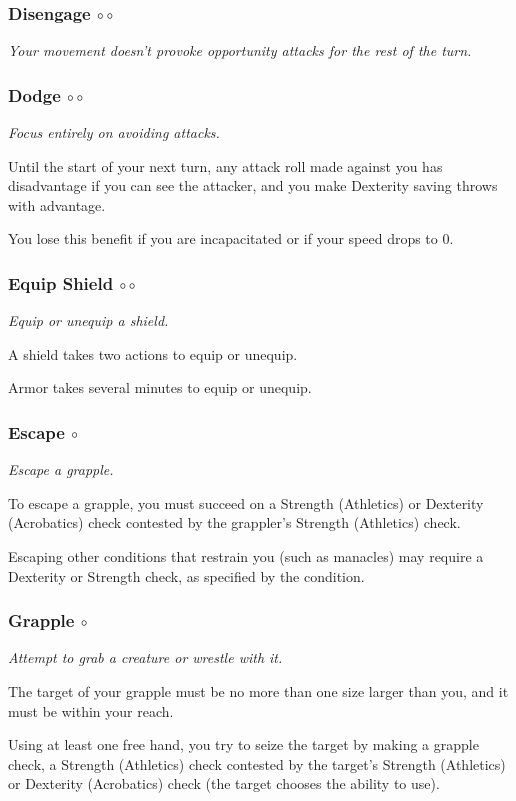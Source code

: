 \subsubsection{Disengage $\circ\circ$} \label{act::disengage}
    \textit{Your movement doesn't provoke opportunity attacks for the rest of the turn.}
\subsubsection{Dodge $\circ\circ$} \label{act::dodge}
    \textit{Focus entirely on avoiding attacks.}

    Until the start of your next turn, any attack roll made against you has disadvantage if you can see the attacker, and you make Dexterity saving throws with advantage.

    You lose this benefit if you are incapacitated or if your speed drops to 0.
\subsubsection{Equip Shield $\circ\circ$} \label{act::equipshield}
    \textit{Equip or unequip a shield.}

    A shield takes two actions to equip or unequip.

    Armor takes several minutes to equip or unequip.
\subsubsection{Escape $\circ$} \label{act::escape}
    \textit{Escape a grapple.}

    To escape a grapple, you must succeed on a Strength (Athletics) or Dexterity (Acrobatics) check contested by the grappler's Strength (Athletics) check.

    Escaping other conditions that restrain you (such as manacles) may require a Dexterity or Strength check, as specified by the condition.
\subsubsection{Grapple $\circ$} \label{act::grapple}
    \textit{Attempt to grab a creature or wrestle with it.}

    The target of your grapple must be no more than one size larger than you, and it must be within your reach.

    Using at least one free hand, you try to seize the target by making a grapple check, a Strength (Athletics) check contested by the target's Strength (Athletics) or Dexterity (Acrobatics) check (the target chooses the ability to use).

